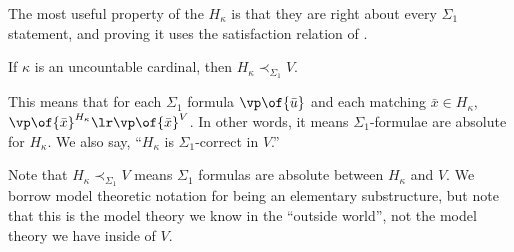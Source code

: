 The most useful property of the $H_{\kappa}$ is that they are right about every $\Sigma_1$ statement, and proving it uses the satisfaction relation of .

\begin{boxtheorem} \label{Ch3:Thm:H_Kappa_Sigma1}
    If $\kappa$ is an uncountable cardinal, then $H_{\kappa} \prec_{\Sigma_1} V$.
\end{boxtheorem}

\begin{remark}
    This means that for each $\Sigma_1$ formula $\vp\of{\bar{u}}$ and each matching $\bar{x} \in H_{\kappa}$, $\vp\of{\bar{x}}^{H_{\kappa}} \lr \vp\of{\bar{x}}^V$. In other words, it means $\Sigma_1$-formulae are absolute for $H_{\kappa}$. We also say, ``$H_{\kappa}$ is $\Sigma_1$-correct in $V$.''
\end{remark}

Note that $H_{\kappa} \prec_{\Sigma_1} V$ means $\Sigma_1$ formulas are absolute between $H_{\kappa}$ and $V$. We borrow model theoretic notation for being an elementary substructure, but note that this is the model theory we know in the ``outside world'', not the model theory we have inside of $V$.

